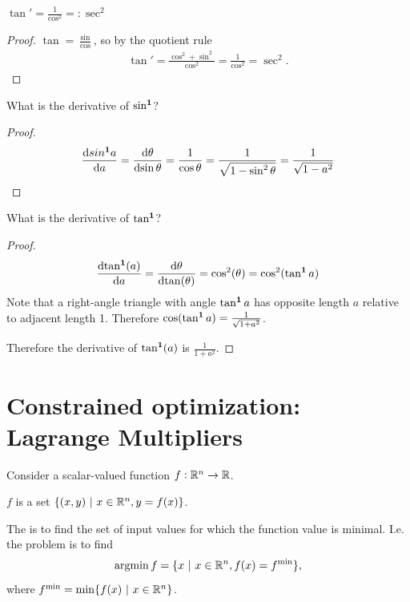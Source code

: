\begin{claim*}
  $\tan' = \frac{1}{\cos^2} =: \sec^2$
\end{claim*}

\begin{proof}
  $\tan = \frac{\sin}{\cos}$, so by the quotient rule
  \begin{align*}
    \tan'
    = \frac{\cos^2 + \sin^2}{\cos^2}
    = \frac{1}{\cos^2}
    = \sec^2.
  \end{align*}
\end{proof}

\begin{claim*}
  What is the derivative of $\sin^{\mathbf 1}$?
\end{claim*}

\begin{proof}
  \begin{align*}
    \frac{\d sin^\1 a}{\d a}
    = \frac{\d \theta}{\d \sin \theta}
    = \frac{1}{\cos \theta}
    = \frac{1}{\sqrt{1 - \sin^2 \theta }}
    = \frac{1}{\sqrt{1 - a^2}}
  \end{align*}
\end{proof}


\begin{claim*}
  What is the derivative of $\tan^{\mathbf 1}$?
\end{claim*}

\begin{proof}
  \begin{align*}
    \frac{\d \tan^\1(a)}{\d a}
    = \frac{\d \theta}{\d \tan(\theta)}
    = \cos^2(\theta)
    = \cos^2(\tan^\1 a)
  \end{align*}
  Note that a right-angle triangle with angle $\tan^{\mathbf 1} a$ has opposite length $a$ relative to
  adjacent length 1. Therefore $\cos(\tan^{\mathbf 1} a) = \frac{1}{\sqrt{1 + a^2}}$.

  Therefore the derivative of $\tan^{\mathbf 1}(a)$ is $\frac{1}{1 + a^2}$.
\end{proof}

\section{Constrained optimization: Lagrange Multipliers}

Consider a scalar-valued function $f:\mathbb{R}^n \to \mathbb{R}$.

$f$ is a set $\{(x, y) ~|~ x \in \mathbb{R}^n, y = f(x) \}$.



\begin{definition*}
  The  is to find the set of input values for which the function value is
  minimal. I.e. the problem is to find
  \begin{align*}
    \operatorname*{argmin} f = \{ x ~|~ x \in \mathbb{R}^n, f(x) = f^{\text{min}} \},
  \end{align*}
  where $f^{\text{min}} = \min\{f(x) ~ | ~ x \in \mathbb{R}^n\}$.
\end{definition*}

